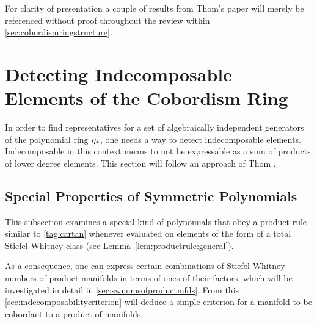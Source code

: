For clarity of presentation a couple of results from Thom's paper
\cite{thom} will merely be referenced without proof throughout the
review within \autoref{sec:cobordismringstructure}.


\section{Detecting Indecomposable Elements of the Cobordism Ring}
\label{sec:indecomposableelements}
In order to find representatives for a set of algebraically
independent generators of the polynomial ring $\eta_*$, one needs a way
to detect indecomposable elements. Indecomposable in this 
context means to not be expressable as a sum of products of lower
degree elements.
This section will follow an approach of Thom 
\cite[Chapters~IV.5 and~IV.6]{thom}.


\subsection{Special Properties of Symmetric Polynomials}
This subsection examines a special kind of polynomials that
obey a product rule similar to \ref{tag:cartan} whenever evaluated on
elements of the form of a total Stiefel-Whitney class
(see Lemma~\autoref{lem:productrule:general}).

As a consequence, one can express certain combinations of
Stiefel-Whitney numbers of product manifolds in terms of ones of their
factors, which will be investigated in detail in
\autoref{sec:swnumsofproductmfds}.
From this \autoref{sec:indecomposabilitycriterion} will deduce a
simple criterion for a manifold to be cobordant to a product of
manifolds.

